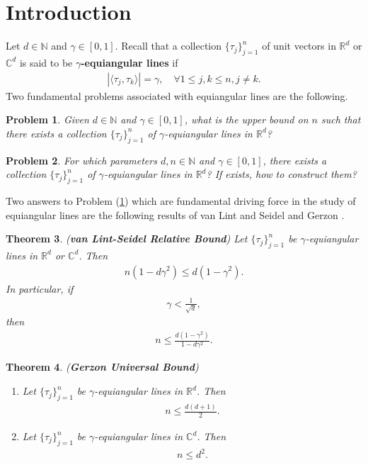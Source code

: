 \documentclass{amsart}
\newtheorem{theorem}{Theorem}[section]
\newtheorem{problem}[theorem]{Problem}
\begin{document}
\section{Introduction}
Let $d \in \mathbb{N}$ and $\gamma \in  [0,1]$. Recall that  a collection $\{\tau_j\}_{j=1}^n$  of unit vectors  in $\mathbb{R}^d$ or $\mathbb{C}^d$	is said to be \textbf{$\gamma$-equiangular  lines} \cite{LEMMENSSEIDEL, HAANTJES}  if 
\begin{align*}
	|\langle \tau_j, \tau_k\rangle|=\gamma, \quad \forall 1\leq j, k \leq n, j \neq k.
\end{align*}	
Two fundamental problems associated with equiangular lines are the following.
\begin{problem}\label{1} 
	Given $d \in \mathbb{N}$ and $\gamma \in  [0,1]$, what is the upper bound on $n$ such that there exists a collection $\{\tau_j\}_{j=1}^n$  of  $\gamma$-equiangular lines in $\mathbb{R}^d$?
\end{problem}
\begin{problem}\label{2} 
	For which parameters $d, n \in \mathbb{N}$ and $\gamma \in  [0,1]$, there exists a collection $\{\tau_j\}_{j=1}^n$  of  $\gamma$-equiangular lines in $\mathbb{R}^d$? If exists, how to construct them?
\end{problem}
Two  answers to Problem (\ref{1}) which are   fundamental driving force in the study of equiangular lines are the following results of van Lint and Seidel \cite{VANLINTSEIDEL, LEMMENSSEIDEL} and Gerzon \cite{WALDONBOOK}.
\begin{theorem} \cite{VANLINTSEIDEL, LEMMENSSEIDEL, GLAZYRINYU, GODSILROYLE} \label{VS} (\textbf{van Lint-Seidel Relative Bound}) 
	Let $\{\tau_j\}_{j=1}^n$  	be  $\gamma$-equiangular  lines in $\mathbb{R}^d$ or $\mathbb{C}^d$. 
	Then 
	\begin{align*}
		n(1-d\gamma^2) \leq d(1-\gamma^2).
	\end{align*}
	In particular, if 
	\begin{align*}
		\gamma < \frac{1}{\sqrt{d}},
	\end{align*}
	then 
	\begin{align}\label{LS}
		n\leq \frac{d(1-\gamma^2)}{1-d\gamma^2}.
	\end{align}
\end{theorem}
\begin{theorem} \cite{WALDONBOOK} \label{GBT}
	(\textbf{Gerzon Universal Bound}) 
	\begin{enumerate}[\upshape(i)]
		\item 
		Let $\{\tau_j\}_{j=1}^n$  	be  $\gamma$-equiangular  lines in $\mathbb{R}^d$. 
		Then 
		\begin{align}\label{GB}
			n \leq \frac{d(d+1)}{2}.
		\end{align}	
		\item 
		Let $\{\tau_j\}_{j=1}^n$  	be  $\gamma$-equiangular  lines in $\mathbb{C}^d$. 
		Then 
		\begin{align}\label{CGB}
			n \leq d^2.
		\end{align}	
	\end{enumerate}
\end{theorem}
\end{document}
